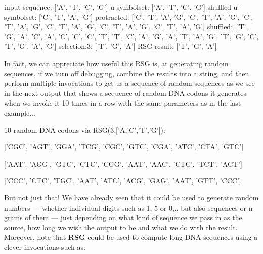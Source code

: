 \documentclass[a4paper, 18pt]{book} %
\begin{document}
 
  \begin{tcbverbatim}[title=Example 3: DEBUG Output of RSG:: Generating a random DNA Codon]
input sequence: ['A', 'T', 'C', 'G']
u-symbolset: ['A', 'T', 'C', 'G']
shuffled u-symbolset: ['C', 'T', 'A', 'G']
protracted: ['C', 'T', 'A', 'G', 'C', 'T', 'A', 'G', 'C', 'T', 'A', 'G', 'C', 'T', 'A', 'G', 'C', 'T', 'A', 'G', 'C', 'T', 'A', 'G']
shuffled: ['T', 'G', 'A', 'C', 'A', 'C', 'C', 'C', 'T', 'T', 'C', 'A', 'G', 'A', 'T', 'A', 'G', 'T', 'G', 'C', 'T', 'G', 'A', 'G']
selection:3: ['T', 'G', 'A']
RSG result: ['T', 'G', 'A']
  \end{tcbverbatim}
  \vspace{1em}
  
  
  In fact, we can appreciate how useful this RSG is, at generating random sequences, if we turn off debugging, combine the results into a string, and then perform multiple invocations to get us a sequence of random sequences as we see in the next output that shows a sequence of random DNA codons it generates when we invoke it 10 times in a row with the same parameters as in the last example...
  
  
    
    \vspace{1em}
  \begin{tcbverbatim}[title=Example 4: Generating 10 random DNA Codons]
10 random DNA codons via RSG(3,['A,'C','T','G']):

['CGC', 'AGT', 'GGA', 'TCG', 'CGC', 'GTC', 'CGA', 'ATC', 'CTA', 'GTC']

['AAT', 'AGG', 'GTC', 'CTC', 'CGG', 'AAT', 'AAC', 'CTC', 'TCT', 'AGT']

['CCC', 'CTC', 'TGC', 'AAT', 'ATC', 'ACG', 'GAG', 'AAT', 'GTT', 'CCC']
  \end{tcbverbatim}
  \vspace{1em}


But not just that! We have already seen that it could be used to generate random numbers --- whether individual digits such as 1, 5 or 0,.. but also sequences or n-grams of them --- just depending on what kind of sequence we pass in as the source, how long we wish the output to be and what we do with the result. Moreover, note that \textbf{RSG} could be used to compute long DNA sequences using a clever invocations such as:

\vspace{1em}
\vspace{1em}
\end{document}
